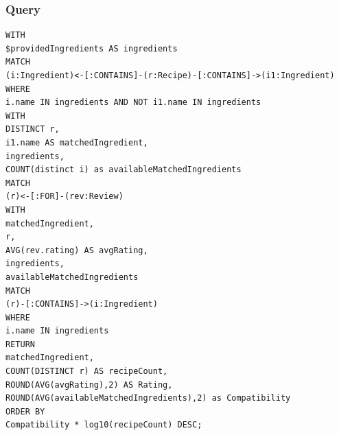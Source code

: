 \begin{enumerate}
        \subsubsection{Query}
        \begin{verbatim}
WITH 
$providedIngredients AS ingredients
MATCH 
(i:Ingredient)<-[:CONTAINS]-(r:Recipe)-[:CONTAINS]->(i1:Ingredient)
WHERE 
i.name IN ingredients AND NOT i1.name IN ingredients
WITH 
DISTINCT r, 
i1.name AS matchedIngredient,
ingredients,
COUNT(distinct i) as availableMatchedIngredients
MATCH 
(r)<-[:FOR]-(rev:Review)
WITH 
matchedIngredient, 
r, 
AVG(rev.rating) AS avgRating,
ingredients,
availableMatchedIngredients
MATCH 
(r)-[:CONTAINS]->(i:Ingredient)
WHERE 
i.name IN ingredients
RETURN 
matchedIngredient, 
COUNT(DISTINCT r) AS recipeCount, 
ROUND(AVG(avgRating),2) AS Rating, 
ROUND(AVG(availableMatchedIngredients),2) as Compatibility
ORDER BY 
Compatibility * log10(recipeCount) DESC;
        \end{verbatim}

\end{enumerate}
